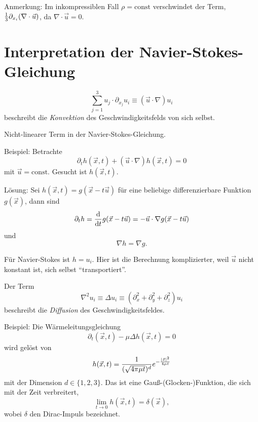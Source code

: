 Anmerkung: Im inkompressiblen Fall $\rho = \mathrm{const}$ verschwindet der
Term, $\frac{1}{3} \partial_{x_i} (\nabla \cdot \vec{u})$, da
$\nabla \cdot \vec{u} = 0$.

\section*{Interpretation der Navier-Stokes-Gleichung}
\[ \sum_{j=1}^3 u_j \cdot \partial_{x_j} u_i \equiv (\vec{u} \cdot \nabla)
  u_i \]
beschreibt die \emph{Konvektion} des Geschwindigkeitsfelds von sich selbst.

Nicht-linearer Term in der Navier-Stokes-Gleichung.

Beispiel: Betrachte
\[ \partial_t h( \vec{x}, t ) + (\vec{u} \cdot \nabla) h(\vec{x},t) = 0 \]
mit $\vec{u} = \mathrm{const}$. Gesucht ist $h(\vec{x},t)$.

Lösung: Sei $h(\vec{x},t) = g(\vec{x} - t \vec{u})$ für eine beliebige
differenzierbare Funktion $g(\vec{x})$, dann sind 
\[ \partial_t h = \frac{\mathrm{d} }{\mathrm{d} t} g(\vec{x} - t \vec{u}) 
  = - \vec{u} \cdot \nabla g(\vec{x} - t \vec{u}) \]
und
\[ \nabla h = \nabla g. \]

Für Navier-Stokes ist $h = u_i$. Hier ist die Berechnung komplizierter, weil
$\vec{u}$ nicht konstant ist, sich selbst ``transportiert''.

Der Term
\[ \nabla^2 u_i \equiv \Delta u_i \equiv (\partial_x^2 + \partial_y^2 + 
  \partial_z^2) u_i \]
beschreibt die \emph{Diffusion} des Geschwindigkeitsfeldes.

Beispiel: Die Wärmeleitungsgleichung
\[ \partial_t ( \vec{x}, t ) - \mu \Delta h (\vec{x},t) = 0 \]
wird gelöst von
\[ h(\vec{x},t) = \frac{1}{(\sqrt{4 \pi \mu t})^d}
  e^{-\frac{|\vec{x}|^2}{4 \mu t}} \]
mit der Dimension $d \in \{1,2,3\}$. Das ist eine Gauß-(Glocken-)Funktion, die
sich mit der Zeit verbreitert,
\[ \lim_{t \to 0} h(\vec{x},t) = \delta(\vec{x}), \]
wobei $\delta$ den Dirac-Impuls bezeichnet.

